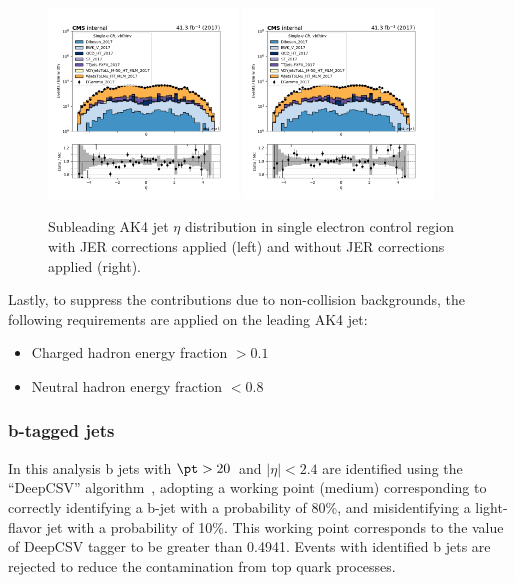 \begin{figure}[htbp]
  \centering
        \includegraphics[width=0.45\textwidth]{fig/datamc/jer_comparison/cr_1e_vbf_ak4_eta1_losf_2017_jer.png}
        \includegraphics[width=0.45\textwidth]{fig/datamc/jer_comparison/cr_1e_vbf_ak4_eta1_losf_2017_nojer.png}
  \caption{Subleading AK4 jet $\eta$ distribution in single electron control region with JER corrections applied (left) 
  and without JER corrections applied (right).}
  \label{fig:jer_correction}
\end{figure}

Lastly, to suppress the contributions due to non-collision backgrounds, the following
requirements are applied on the leading AK4 jet:
\begin{itemize}
\item Charged hadron energy fraction $> 0.1$
\item Neutral hadron energy fraction $< 0.8$
\end{itemize}

\subsubsection{b-tagged jets}

In this analysis b jets with $\pt > 20$~\GeV and $|\eta| < 2.4$ are identified
using the ``DeepCSV'' algorithm~\cite{Sirunyan:2017ezt},
adopting a working point (medium) corresponding to correctly identifying a b-jet with a
probability of 80\%, and misidentifying a light-flavor jet with a probability of 10\%.
This working point corresponds to the value of DeepCSV tagger to be greater than 0.4941.
Events with identified b jets are rejected to reduce the contamination from top quark processes.

